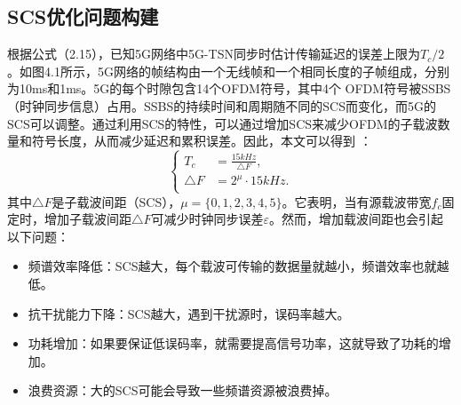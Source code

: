 \documentclass[UTF8,a4paper,12pt]{ctexart}
\numberwithin{equation}{section}
\begin{document}
	\subsection{SCS优化问题构建}
	根据公式（2.15），已知5G网络中5G-TSN同步时估计传输延迟的误差上限为$T_c/2$。如图4.1所示，5G网络的帧结构由一个无线帧和一个相同长度的子帧组成，分别为10ms和1ms。5G的每个时隙包含14个OFDM符号，其中4个 OFDM符号被SSBS（时钟同步信息）占用。SSBS的持续时间和周期随不同的SCS而变化，而5G的SCS可以调整。通过利用SCS的特性，可以通过增加SCS来减少OFDM的子载波数量和符号长度，从而减少延迟和累积误差。因此，本文可以得到 ：
	\begin{equation}
		\left\{
		\begin{aligned}
			T_{c}&=\frac{15kHz}{\triangle F},\\
			\triangle F&=2^\mu\cdot15kHz.\\
		\end{aligned}
		\right.
	\end{equation}
	其中$\triangle F$是子载波间距（SCS），$\mu=\{0,1,2,3,4,5\}$。它表明，当有源载波带宽$f_c$固定时，增加子载波间距$\triangle F$可减少时钟同步误差$\varepsilon$。然而，增加载波间距也会引起以下问题：
	\begin{itemize}
		\item 频谱效率降低：SCS越大，每个载波可传输的数据量就越小，频谱效率也就越低。
		
		\item 抗干扰能力下降：SCS越大，遇到干扰源时，误码率越大。
		
		\item 功耗增加：如果要保证低误码率，就需要提高信号功率，这就导致了功耗的增加。
		
		\item 浪费资源：大的SCS可能会导致一些频谱资源被浪费掉。
	\end{itemize}
	
\end{document}
